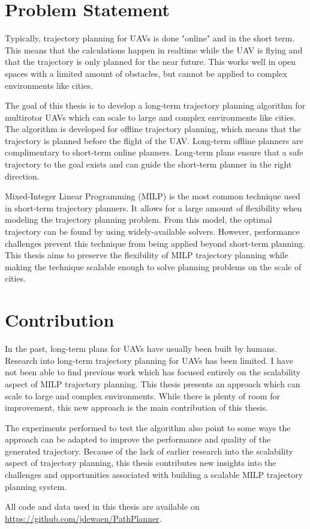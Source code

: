 \section{Problem Statement}
Typically, trajectory planning for UAVs is done "online" and in the short term. This means that the calculations happen in realtime while the UAV is flying and that the trajectory is only planned for the near future. This works well in open spaces with a limited amount of obstacles, but cannot be applied to complex environments like cities.
\par
The goal of this thesis is to develop a long-term trajectory planning algorithm for multirotor UAVs which can scale to large and complex environments like cities. The algorithm is developed for offline trajectory planning, which means that the trajectory is planned before the flight of the UAV. Long-term offline planners are complimentary to short-term online planners. Long-term plans ensure that a safe trajectory to the goal exists and can guide the short-term planner in the right direction.
\par
Mixed-Integer Linear Programming (MILP) is the most common technique used in short-term trajectory planners. It allows for a large amount of flexibility when modeling the trajectory planning problem. From this model, the optimal trajectory can be found by using widely-available solvers. However, performance challenges prevent this technique from being applied beyond short-term planning. This thesis aims to preserve the flexibility of MILP trajectory planning while making the technique scalable enough to solve planning problems on the scale of cities.

\section{Contribution}
In the past, long-term plans for UAVs have usually been built by humans. Research into long-term trajectory planning for UAVs has been limited. I have not been able to find previous work which has focused entirely on the scalability aspect of MILP trajectory planning. This thesis presents an approach which can scale to large and complex environments. While there is plenty of room for improvement, this new approach is the main contribution of this thesis.
\par
The experiments performed to test the algorithm also point to some ways the approach can be adapted to improve the performance and quality of the generated trajectory. Because of the lack of earlier research into the scalability aspect of trajectory planning, this thesis contributes new insights into the challenges and opportunities associated with building a scalable MILP trajectory planning system.
\par
All code and data used in this thesis are available on \url{https://github.com/jdewaen/PathPlanner}.

